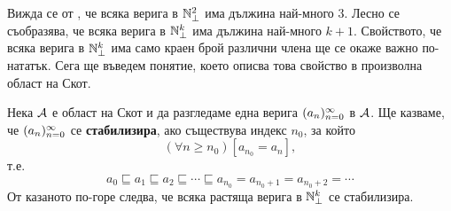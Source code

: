 Вижда се от , че всяка верига в $\mathbb{N}^2_\bot$ има дължина най-много $3$.
Лесно се съобразява, че всяка верига в $\mathbb{N}^k_\bot$ има дължина най-много $k+1$.
Свойството, че всяка верига в $\mathbb{N}^k_\bot$ има само краен брой различни члена
ще се окаже важно по-нататък. Сега ще въведем понятие, което описва това свойство в произволна област на Скот.

Нека $\mathcal{A}$ е област на Скот и да разгледаме една верига $(a_{n})^{\infty}_{n=0}$ в $\mathcal{A}$.
Ще казваме, че $(a_{n})^{\infty}_{n=0}$ се {\bf стабилизира}, ако съществува индекс $n_0$, за който
\[(\forall n \geq n_0)[a_{n_0} = a_{n}],\]
т.е.
\[a_0 \sqsubseteq a_1 \sqsubseteq a_2 \sqsubseteq \cdots \sqsubseteq a_{n_0} = a_{n_0+1} = a_{n_0+2} = \cdots\]
От казаното по-горе следва, че всяка растяща верига в $\mathbb{N}^k_\bot$ се стабилизира.





